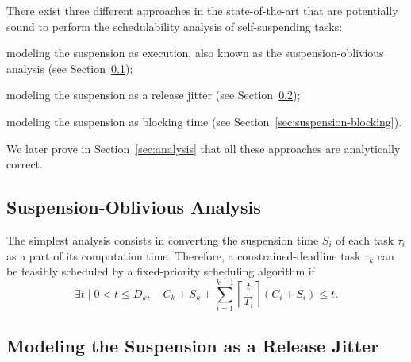 \documentclass[10pt,conference,preprint]{IEEEtran}
\newcommand{\ceiling}[1]{\left\lceil{#1}\right\rceil}
\begin{document}

There exist three different approaches in the state-of-the-art 
that are potentially sound to perform the schedulability analysis of self-suspending tasks:
\begin{compactitem}
\item modeling the suspension as execution, also known as the suspension-oblivious analysis (see Section~\ref{sec:suspension-oblivious});
\item modeling the suspension as a release jitter (see Section~\ref{sec:jitter});
\item modeling the suspension as blocking time (see Section~\ref{sec:suspension-blocking}).
\end{compactitem}
We later prove in Section~\ref{sec:analysis} that all these approaches are analytically correct. 

\subsection{Suspension-Oblivious Analysis}
\label{sec:suspension-oblivious} 
The simplest analysis consists in converting the suspension time $S_i$ of each %
task $\tau_i$ as a part of its computation
time. Therefore, a constrained-deadline task $\tau_k$ can be feasibly
scheduled by a fixed-priority scheduling algorithm if
\begin{equation}
\label{eq:TDA-SO}
\exists t \mid 0 < t \leq D_k, \quad C_k + S_k + \sum_{i=1}^{k-1}\ceiling{\frac{t}{T_i}} (C_i+S_i) \leq t.
\end{equation}

\subsection{Modeling the Suspension as a Release Jitter}
\label{sec:jitter}
\end{document}
